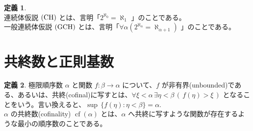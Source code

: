 \documentclass{jsarticle}
\theoremstyle{definition}
\newtheorem*{definition*}{定義}
\begin{document}
    \begin{definition*}\ \\
        連続体仮説 $\rm(CH)$ とは、言明「$2^{\aleph_0} = \aleph_1$ 」のことである。\\
        一般連続体仮説 $\rm(GCH)$ とは、言明「$\forall \alpha (2^{\aleph_\alpha} = \aleph_{\alpha+1})$ 」のことである。
    \end{definition*}
    \newpage
    
    \section{共終数と正則基数}
    \begin{definition*} \label{cofinal}
       極限順序数 $\alpha$ と関数 $f : \beta \rightarrow \alpha$ について、$f$ が非有界(unbounded)である、あるいは、共終(cofinal)に写すとは、$\forall \xi < \alpha \, \exists \eta < \beta \,(\,f(\eta) > \xi\,)$ となることをいう。言い換えると、$\sup\,\{f(\eta) : \eta < \beta\} = \alpha.$\\
       $\alpha$ の共終数(cofinality) $\operatorname{cf}(\alpha)$ とは、$\alpha$ へ共終に写すような関数が存在するような最小の順序数のことである。
    \end{definition*}
    
\end{document}
